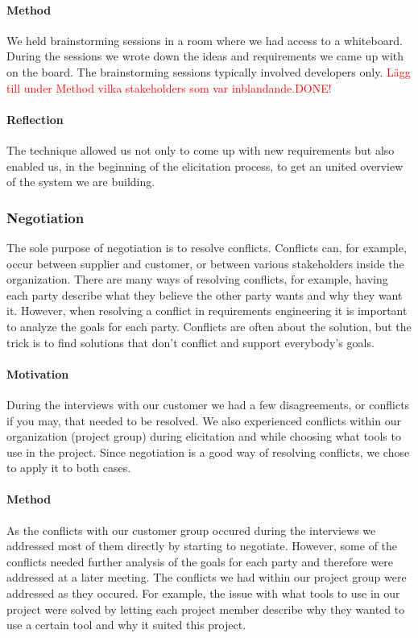 \documentclass[10pt]{article}
\newcommand\todo[1]{\textcolor{red}{#1}}
\begin{document}
\paragraph{Method}
\hfill \break
We held brainstorming sessions in a room where we had access to a whiteboard. During the sessions we wrote down the ideas and requirements we came up with on the board. The brainstorming sessions typically involved developers only.  
\todo{Lägg till under Method vilka stakeholders som var inblandande.DONE!}
\paragraph{Reflection}
\hfill \break
The technique allowed us not only to come up with new requirements but also enabled us, in the beginning of the elicitation process, to get an united overview of the system we are building.

\subsubsection{Negotiation}
The sole purpose of negotiation is to resolve conflicts. Conflicts can, for example, occur between supplier and customer, or between various stakeholders inside the organization. There are many ways of resolving conflicts, for example, having each party describe what they believe the other party wants and why they want it. However, when resolving a conflict in requirements engineering it is important to analyze the goals for each party. Conflicts are often about the solution, but the trick is to find solutions that don’t conflict and support everybody’s goals.
\paragraph{Motivation}
\hfill \break
During the interviews with our customer we had a few disagreements, or conflicts if you may, that needed to be resolved. We also experienced conflicts within our organization (project group) during elicitation and while choosing what tools to use in the project. Since negotiation is a good way of resolving conflicts, we chose to apply it to both cases.
\paragraph{Method}
\hfill \break
As the conflicts with our customer group occured during the interviews we addressed most of them directly by starting to negotiate. However, some of the conflicts needed further analysis of the goals for each party and therefore were addressed at a later meeting. The conflicts we had within our project group were addressed as they occured. For example, the issue with what tools to use in our project were solved by letting each project member describe why they wanted to use a certain tool and why it suited this project. 
\end{document}
